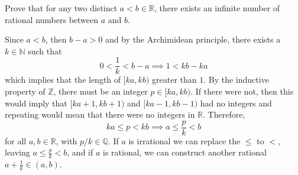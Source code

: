   \begin{exercise}
    Prove that for any two distinct $a < b \in \mathbb{R}$, there exists an infinite number of rational numbers between $a$ and $b$. 
  \end{exercise}
  \begin{solution}
    Since $a< b$, then $b - a > 0$ and by the Archimidean principle, there exists a $k \in \mathbb{N}$ such that 
    \begin{equation}
      0 < \frac{1}{k} < b - a \implies 1 < kb - ka
    \end{equation}
    which implies that the length of $[ka, kb)$ greater than $1$. By the inductive property of $\mathbb{Z}$, there must be an integer $p \in [ka, kb)$. If there were not, then this would imply that $[ka+1, kb+1)$ and $[ka-1, kb-1)$ had no integers and repeating would mean that there were no integers in $\mathbb{R}$. Therefore, 
    \begin{equation}
      ka \leq p < kb \implies a \leq \frac{p}{k} < b
    \end{equation}
    for all $a, b \in \mathbb{R}$, with $p/k \in \mathbb{Q}$. If $a$ is irrational we can replace the $\leq$ to $<$, leaving $a \leq \frac{p}{k} < b$, and if $a$ is rational, we can construct another rational $a + \frac{1}{k} \in (a, b)$. 
  \end{solution}

